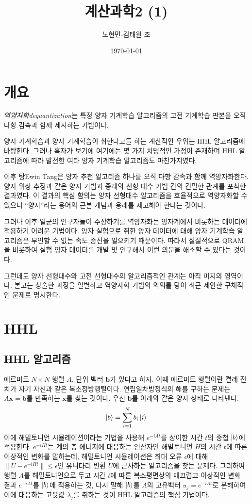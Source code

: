 \documentclass[a4paper,atbegshi,chapter,itemph,hidelinks,14pt]{oblivoir}
\title{계산과학2 (1)}
\author{노현민-김태원 조}
\date{\today}
\begin{document}
\maketitle\pagestyle{empty}\newpage
\tableofcontents
\chapter{개요}
\emph{역양자화\footnotesize dequantization}는 특정 양자 기계학습 알고리즘의
고전 기계학습 판본을 오직 다항 감속과 함께 제시하는 기법이다. 

양자 기계학습과 양자 기계학습이 취한다고들 하는 계산적인 우위는 HHL 알고리즘에
바탕한다. 그러나 혹자가 보기에 여기에는 몇 가지 치명적인 가정이 존재하며 HHL
알고리즘에 따라 발전한 여타 양자 기계학습 알고리즘도 마찬가지였다.

이후 탕{\tiny Ewin Tang}은 양자 추천 알고리즘 하나를 오직 다항 감속과 함께
역양자화한다. 양자 위상 추정과 같은 양자 기법과 종래의 선형 대수 기법 간의
긴밀한 관계를 포착한 결과였다. 이 결과의 핵심 함의는 양자 선형대수 알고리즘을
효율적으로 역양자화할 수 있으니 ``양자''라는 용어의 근본 개념과 용래를 재고해야
한다는 것이다. 

그러나 이후 일군의 연구자들이 주장하기를 역양자화는 양자계에서 비롯하는
데이터에 적용하기 어려운 기법이다. 양자 실험으로 취한 양자 데이터에 대해 양자
기계학습 알고리즘은 부인할 수 없는 속도 증진을 일으키기 때문이다. 따라서 
실질적으로 QRAM을 비롯하여 실험 양자 데이터를 개발 및 연구해서 이런 의문을 
해소할 수 있다는 것이다. 

그런데도 양자 선형대수와 고전 선형대수의 알고리즘적인 관계는 아직 미지의
영역이다. 본고는 상술한 과정을 일별하고 역양자화 기법의 의의를 탕이 최근
제안한 구체적인 문제로 명시한다. 
\chapter{HHL}
\section{HHL 알고리즘}
에르미트 $N\times N$ 행렬 $A$, 단위 벡터 $\pmb{b}$가 있다고 하자. 이때 에르미트
행렬이란 켤레 전치가 자기 자신과 같은 복소정방행렬이다. 연립일차방정식의
해를 구하는 문제는 $A\pmb{x}=\pmb{b}$를 만족하는 $\mathbf{x}$를 찾는 것이다. 우선
$\pmb{b}$를 아래와 같은 양자 상태로 나타낸다.
\[
  \ket{b} = \sum_{i=1}^N b_i\ket{i}
\]
이에 해밀토니언 시뮬레이션이라는 기법을 사용해 $e^{-iAt}$를 상이한 시간 $t$의 중첩
$\ket{b}$에 적용한다. $e^{-iHt}$는 계의 총 에너지에 대응하는 연산자인 해밀토니언
$H$의 시간 $t$에 따른 이상적인 변화를 말하는데, 해밀토니언 시뮬레이션은 최대
오류 $\epsilon$에 대해 $\|U-e^{-iHt}\|\leq\epsilon$인 유니타리 변환 $U$에 
근사하는 알고리즘을 찾는 문제다. 그리하여 행렬 $A$를 해밀토니언으로 두고
시간 $t$에 따른 복소평면상의 매끄럽고 이상적인 변화 결과 $e^{-iAt}$를 $\ket{b}$에
적용하는 것, 다시 말해 $\ket{b}$를 $A$의 고유벡터 $u_j=e^{-iAt}$로 분해하여 이에
대응하는 고윳값 $\lambda_j$를 취하는 것이 HHL 알고리즘의 핵심 기법이다.
\end{document}
